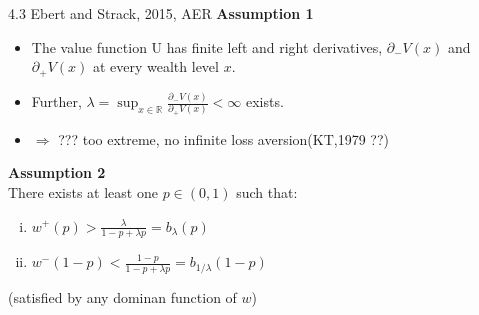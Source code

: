 \documentclass[11pt,aspectratio=169]{beamer}
\begin{document}
\begin{frame}{4.3 Ebert and Strack, 2015, AER}
    \textbf{Assumption 1}\\
    \begin{itemize}
        \item The value function U has finite left and right derivatives, 
       $\partial _-V(x)$ and $\partial _+V(x)$ at every wealth level $x$.\medskip
        \item Further, $\lambda = \sup _{x\in \mathbb{R} } \frac{\partial _-V(x)}{\partial _+V(x)} < \infty$ exists.\medskip
        \item $\Rightarrow$ ??? too extreme, no infinite loss aversion(KT,1979 ??)\medskip
    \end{itemize}
    \textbf{Assumption 2}\\
    There exists at least one $p \in (0,1)$ such that:
    \begin{enumerate}[(i)]
        \item $w^+(p)> \frac{\lambda}{1-p+\lambda p} =b_{\lambda}(p)$ \medskip
        \item $w^-(1-p)< \frac{1-p}{1-p+\lambda p} =b_{1/\lambda}(1-p) $  \medskip
	\end{enumerate}
(satisfied by any dominan function of $w$)\\
\end{frame}
\end{document}
